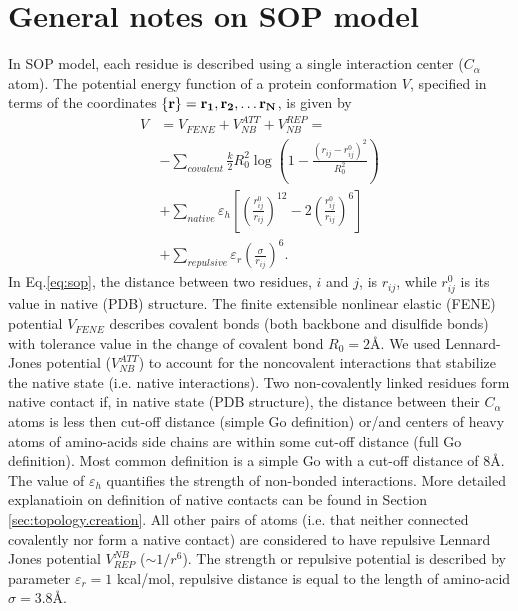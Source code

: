 \documentclass[a4paper]{article}
\begin{document}
\section{General notes on SOP model}
\label{sec:sop}
In SOP model, each residue is described using a single interaction center ($C_{\alpha}$ atom). The potential energy function of a protein conformation $V$, specified in terms of the coordinates $\bf{\{r\}}=\bf{r}_1, \bf{r}_2, \ldots \bf{r}_N$, is given by
\begin{equation}\label{eq:sop}
\begin{split}
V&=V_{FENE}+V^{ATT}_{NB}+V^{REP}_{NB}=\\
&-\sum_{covalent}{\frac{k}{2}R_0^2\log{\left(1-\frac{\left(r_{ij}-r^0_{ij}\right)^2}{R_0^2}\right)}}\\
&+\sum_{native}\varepsilon_h\left[\left(\frac{r^{0}_{ij}}{r_{ij}}\right)^{12}-2\left(\frac{r^{0}_{ij}}{r_{ij}}\right)^{6}\right]\\
&+\sum_{repulsive}{\varepsilon_r\left(\frac{\sigma}{r_{ij}}\right)^{6}}.
\end{split}
\end{equation}
In Eq.\ref{eq:sop}, the distance between two residues, $i$ and $j$, is $r_{ij}$, while $r^0_{ij}$ is its value in native (PDB) structure. The finite extensible nonlinear elastic (FENE) potential $V_{FENE}$ describes covalent bonds (both backbone and disulfide bonds) with tolerance value in the change of covalent bond $R_0 = 2$\AA. We used Lennard-Jones potential ($V^{ATT}_{NB}$) to account for the noncovalent interactions that stabilize the native state (i.e. native interactions). Two non-covalently linked residues form native contact if, in native state (PDB structure), the distance between their $C_{\alpha}$ atoms is less then cut-off distance (simple Go definition) or/and centers of heavy atoms of amino-acids side chains are within some cut-off distance (full Go definition). Most common definition is a simple Go with a cut-off distance of $8$\AA. The value of $\varepsilon_h$ quantifies the strength of non-bonded interactions. More detailed explanatioin on definition of native contacts can be found in 
Section \ref{sec:topology.creation}. All other pairs of atoms (i.e. that neither connected covalently nor form a native contact) are considered to have repulsive Lennard Jones potential $V^{NB}_{REP}$ ($\sim 1/r^6$). The strength or repulsive potential is described by parameter $\varepsilon_r = 1$ kcal/mol, repulsive distance is equal to the length of amino-acid $\sigma = 3.8$\AA.
\end{document}
